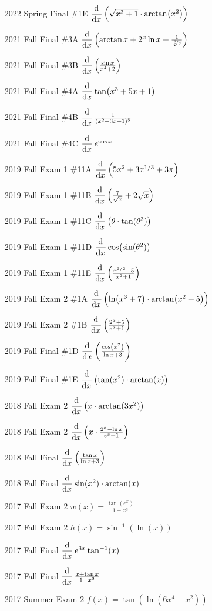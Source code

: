 \documentclass[10pt]{scrartcl}
\theoremstyle{definition}
\newcommand{\inv}{^{-1}}
\begin{document}
\begin{enumerate}
\item[2022 Spring Final \#1E] $\dod{}{x} \left( \sqrt{x^3+1} \cdot \arctan(x^2) \right)$
\item[2021 Fall Final \#3A] $\dod{}{x} \left( \arctan x + 2^x \ln x + \frac{1}{\sqrt[3]{x}} \right)$
\item[2021 Fall Final \#3B] $\dod{}{x} \left( \frac{\sin x}{x^4+2} \right)$
\item[2021 Fall Final \#4A] $\dod{}{x} \tan(x^3+5x+1)$
\item[2021 Fall Final \#4B] $\dod{}{x} \frac{1}{(x^2+3x+1)^5}$
\item[2021 Fall Final \#4C] $\dod{}{x} e^{\cos x}$
\item[2019 Fall Exam 1 \#11A] $\dod{}{x} \left( 5x^2+3x^{1/3}+3\pi \right)$
\item[2019 Fall Exam 1 \#11B] $\dod{}{x} \left( \frac{7}{\sqrt x}+2\sqrt x \right)$
\item[2019 Fall Exam 1 \#11C] $\dod{}{x} \left( \theta\cdot\tangent(\theta^3) \right)$
\item[2019 Fall Exam 1 \#11D] $\dod{}{x} \cos(\sine(\theta^2))$
\item[2019 Fall Exam 1 \#11E] $\dod{}{x} \left( \frac{x^{3/2}-5}{x^2+1} \right)$
\item[2019 Fall Exam 2 \#1A] $\dod{}{x} \left( \ln(x^3+7) \cdot \arctan(x^2+5) \right)$
\item[2019 Fall Exam 2 \#1B] $\dod{}{x} \left( \frac{2^x+5}{e^x+1} \right)$
\item [2019 Fall Final \#1D] $\dod{}{x} \left(\frac{\cos(x^7)}{\ln x+3}\right)$
\item [2019 Fall Final \#1E] $\dod{}{x} \left(\tangent(x^2)\cdot\arctan(x)\right)$
\item[2018 Fall Exam 2] $\dod{}{x}\left(x \cdot \arctangent(3x^2)\right)$
\item[2018 Fall Exam 2] $\dod{}{x}\left(x \cdot \frac{2^x - \ln x}{e^x + 1} \right)$
\item[2018 Fall Final] $\dod{}{x}\left( \frac{\tan x}{\ln x + 3} \right)$
\item[2018 Fall Final] $\dod{}{x} \sine(x^2) \cdot \arctangent(x)$
\item [2017 Fall Exam 2] $w(x) = \frac{\tan(e^x)}{1+x^3}$
\item [2017 Fall Exam 2] $h(x) = \sin\inv(\ln(x))$
\item [2017 Fall Final] $\dod{}{x} e^{3x} \tan\inv(x)$
\item [2017 Fall Final] $\dod{}{x} \frac{x+\tan x}{1-x^2}$
\item [2017 Summer Exam 2] $f(x) = \tan(\ln(6x^4+x^2))$

\end{enumerate}
\end{document}
